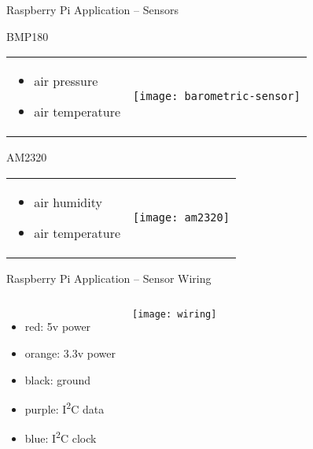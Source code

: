 \documentclass[aspectratio=169]{beamer}
\begin{document}
  \begin{frame}{Raspberry Pi Application -- Sensors}
      \begin{block}{BMP180}
        \begin{tabularx}{\textwidth}{XC}
          \begin{itemize}
            \item air pressure
            \item air temperature
          \end{itemize}
          &
          \texttt{[image: barometric-sensor]}
        \end{tabularx}
      \end{block}

      \begin{block}{AM2320}
        \begin{tabularx}{\textwidth}{XC}

          \begin{itemize}
            \item air humidity
            \item air temperature
          \end{itemize}
          &
          \texttt{[image: am2320]}
        \end{tabularx}
      \end{block}
  \end{frame}

  \begin{frame}{Raspberry Pi Application -- Sensor Wiring}
    \begin{columns}

      \begin{itemize}
        \item {\color{red}red:} 5v power
        \item {\color{orange}orange:} 3.3v power
        \item {\color{black}black:} ground
        \item {\color{purple}purple:} I\textsuperscript{2}C data
        \item {\color{blue}blue:} I\textsuperscript{2}C clock
      \end{itemize}

      \vspace*{1em}
      \texttt{[image: wiring]}
    \end{columns}
  \end{frame}
\end{document}
